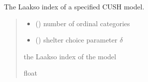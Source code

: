 \documentclass[letterpaper,10pt,english]{sphinxmanual}
\begin{document}
\begin{fulllineitems}
\label{\detokenize{cubmods:cubmods.cush.laakso}}
\pysigstartsignatures
{}
\pysigstopsignatures
\sphinxAtStartPar
The Laakso index of a specified CUSH model.
\begin{quote}\begin{description}
\begin{itemize}
\item {} 
\sphinxAtStartPar
{} () \textendash{} number of ordinal categories

\item {} 
\sphinxAtStartPar
{} () \textendash{} shelter choice parameter \(\delta\)

\end{itemize}

\sphinxAtStartPar
the Laakso index of the model

\sphinxAtStartPar
float

\end{description}\end{quote}

\end{fulllineitems}

\end{document}
